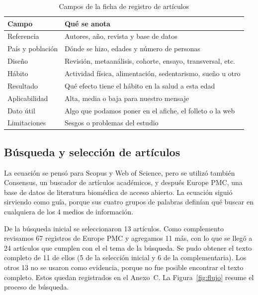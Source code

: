\documentclass[12pt, letterpaper, table, xcdraw]{extarticle}
\renewcommand{\arraystretch}{2}
\newcommand{\leyendaFont}[1]{\fontsize{10}{12}\selectfont #1}
\begin{document}
\begin{table}[!htbp]
    \centering
    \caption{\leyendaFont{Campos de la ficha de registro de artículos}}
    \label{tab:ficha}
    {\small
    \renewcommand{\arraystretch}{1.4}
    \begin{tabularx}{\textwidth}{|>{\raggedright\arraybackslash}p{3.2cm}|>{\raggedright\arraybackslash}X|}
        \hline
        \textbf{Campo} & \textbf{Qué se anota} \\ \hline
        Referencia & Autores, año, revista y base de datos \\ \hline
        País y población & Dónde se hizo, edades y número de personas \\ \hline
        Diseño & Revisión, metaanálisis, cohorte, ensayo, transversal, etc. \\ \hline
        Hábito & Actividad física, alimentación, sedentarismo, sueño u otro \\ \hline
        Resultado & Qué efecto tiene el hábito en la salud a esta edad \\ \hline
        Aplicabilidad & Alta, media o baja para nuestro mensaje \\ \hline
        Dato útil & Algo que podamos poner en el afiche, el folleto o la web \\ \hline
        Limitaciones & Sesgos o problemas del estudio \\ \hline
    \end{tabularx}
    }
\end{table}

\subsection{Búsqueda y selección de artículos}

La ecuación se pensó para Scopus y Web of Science, pero se utilizó también Consensus, un buscador de artículos académicos, y después Europe PMC, una base de datos de literatura biomédica de acceso abierto. La ecuación siguió sirviendo como guía, porque sus cuatro grupos de palabras definían qué buscar en cualquiera de los 4 medios de información.

De la búsqueda inicial se seleccionaron 13 artículos. Como complemento revisamos 67 registros de Europe PMC y agregamos 11 más, con lo que se llegó a 24 artículos que cumplen con el el tema de la búsqueda. Se pudo obtener el texto completo de 11 de ellos (5 de la selección inicial y 6 de la complementaria). Los otros 13 no se usaron como evidencia, porque no fue posible encontrar el texto completo. Estos quedan registrados en el Anexo~C. La Figura~\ref{fig:flujo} resume el proceso de búsqueda.
\end{document}
